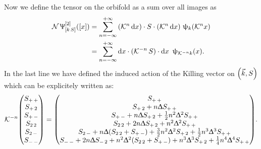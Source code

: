 Now we define the tensor on the orbifold as a sum over all images as
\begin{equation}
  \begin{split}
    \mathcal{N}\,
    \Uppsi^{[2]}_{[k\, S]}\qty(\qty[x])
    & =
    \sum\limits_{n = -\infty}^{+\infty}
    \qty( \mathcal{K}^n \dd{x}) \cdot S \cdot ( \mathcal{K}^n \dd{x})~
    \uppsi_{k}( \mathcal{K}^n x)
    \\
    & =
    \sum\limits_{n = -\infty}^{+\infty}
    \dd{x} \cdot ( \mathcal{K}^{-n}\, S ) \cdot \dd{x}~
    \uppsi_{\mathcal{K}^{-n} k}\qty(x).
  \end{split}
\end{equation}
In the last line we have defined the induced action of the Killing vector on $\qty(\vec{k}, S)$ which can be explicitely written as:
\begin{equation}
  \cK^{-n}
  \mqty(%
    S_{ +\, + }
    \\
    S_{ +\, 2 }
    \\
    S_{ +\, - }
    \\
    S_{ 2\, 2 }
    \\
    S_{ 2\, - }
    \\
    S_{ -\, - }
  )
  =
  \mqty(%
    S_{ +\, + }
    \\
    S_{ +\, 2 } + n \Delta S_{ +\, + }
    \\
    S_{ +\, - } + n \Delta S_{ +\, 2 } + \frac{1}{2} n^2 \Delta^2 S_{ +\, + }
    \\
    S_{ 2\, 2 } + 2 n \Delta S_{ +\, 2 } + n^2 \Delta^2 S_{ +\, + }
    \\
    S_{ 2\, - } + n \Delta \qty(S_{ 2\, 2 } + S_{ +\, - }) + \frac{3}{2} n^2 \Delta^2 S_{ +\, 2 } + \frac{1}{2} n^3 \Delta^3 S_{ +\, + }
    \\
    S_{ -\, - } + 2 n \Delta S_{ -\, 2 } + n^2 \Delta^2 \qty(S_{ 2\, 2 } + S_{ +\, - } ) + n^3 \Delta^3 S_{ +\, 2 } + \frac{1}{4} n^4 \Delta^4 S_{ +\, + }
  ).
\end{equation}
  
